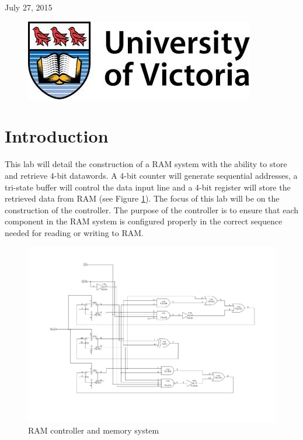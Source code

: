 \documentclass[11pt]{article}
\begin{document}
\begin{titlepage}
{\large July 27, 2015}\\ %

\begin{figure}[b]	 %
	\centering
	\includegraphics[scale=0.3]{UVic_logo}
\end{figure}

\end{titlepage}


\section{Introduction}

This lab will detail the construction of a RAM system with the ability to store and retrieve 4-bit datawords. A 4-bit counter will generate sequential addresses, a tri-state buffer will control the data input line and a 4-bit register will store the retrieved data from RAM (see Figure \ref{fig:controller}). The focus of this lab will be on the construction of the controller. The purpose of the controller is to ensure that each component in the RAM system is configured properly in the correct sequence needed for reading or writing to RAM.

\begin{figure}[htpb]
	\centering
	\includegraphics[scale=0.5]{controller}
	\caption{RAM controller and memory system}
	\label{fig:controller}
\end{figure}
\end{document}
